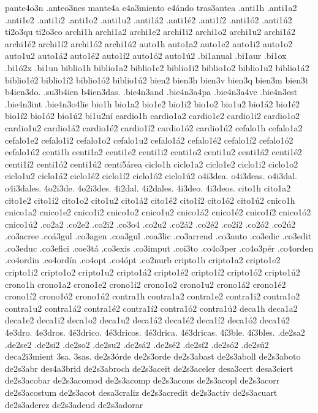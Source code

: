 {pante4o3n
.anteo3nes
mante4a
e4a3miento
e4ándo
tras3antea
.anti1h
.anti1a2 .anti1e2 .anti1i2 .anti1o2 .anti1u2
.anti1á2 .anti1é2 .anti1í2 .anti1ó2 .anti1ú2
ti2o3qu
ti2o3co
archi1h
archi1a2 archi1e2 archi1i2 archi1o2 archi1u2
archi1á2 archi1é2 archi1í2 archi1ó2 archi1ú2
auto1h
auto1a2 auto1e2 auto1i2 auto1o2 auto1u2
auto1á2 auto1é2 auto1í2 auto1ó2 auto1ú2
.bi1anual
.bi1aur
.bi1ox
.bi1ó2x
.bi1un
biblio1h
biblio1a2 biblio1e2 biblio1i2 biblio1o2 biblio1u2
biblio1á2 biblio1é2 biblio1í2 biblio1ó2 biblio1ú2
bien2
bien3h
bien3v
bien3q
bien3m
bien3t
b4ien3do.
.su3b4ien
b4ien3das.
.bie4n3and
.bie4n3a4pa
.bie4n3a4ve
.bie4n3est
.bie4n3int
.bie4n3o4lie
bio1h
bio1a2 bio1e2 bio1i2 bio1o2 bio1u2
bio1á2 bio1é2 bio1í2 bio1ó2 bio1ú2
bi1u2ní
cardio1h
cardio1a2 cardio1e2 cardio1i2 cardio1o2 cardio1u2
cardio1á2 cardio1é2 cardio1í2 cardio1ó2 cardio1ú2
cefalo1h
cefalo1a2 cefalo1e2 cefalo1i2 cefalo1o2 cefalo1u2
cefalo1á2 cefalo1é2 cefalo1í2 cefalo1ó2 cefalo1ú2
centi1h
centi1a2 centi1e2 centi1i2 centi1o2 centi1u2
centi1á2 centi1é2 centi1í2 centi1ó2 centi1ú2
centi5área
ciclo1h
ciclo1a2 ciclo1e2 ciclo1i2 ciclo1o2 ciclo1u2
ciclo1á2 ciclo1é2 ciclo1í2 ciclo1ó2 ciclo1ú2
o4i3dea.
o4i3deas.
o4i3dal.
o4i3dales.
4o2i3de.
4o2i3des.
4i2dal.
4i2dales.
4i3deo.
4i3deos.
cito1h
cito1a2 cito1e2 cito1i2 cito1o2 cito1u2
cito1á2 cito1é2 cito1í2 cito1ó2 cito1ú2
cnico1h
cnico1a2 cnico1e2 cnico1i2 cnico1o2 cnico1u2
cnico1á2 cnico1é2 cnico1í2 cnico1ó2 cnico1ú2
.co2a2
.co2e2
.co2i2
.co3o4
.co2u2
.co2á2
.co2é2
.co2í2
.co2ó2
.co2ú2
.co3acree
.coá3gul
.co3agen
.coa3gul
.coa3lic
.co3arrend
.co3auto
.co3edic
.co3edit
.co3educ
.co3efici
.coe3tá
.co3exis
.co3imput
.coi3to
.co4o3per
.co4o3pér
.co4orden
.co4ordin
.co4ordín
.co4opt
.co4ópt
.co2nurb
cripto1h
cripto1a2 cripto1e2 cripto1i2 cripto1o2 cripto1u2
cripto1á2 cripto1é2 cripto1í2 cripto1ó2 cripto1ú2
crono1h
crono1a2 crono1e2 crono1i2 crono1o2 crono1u2
crono1á2 crono1é2 crono1í2 crono1ó2 crono1ú2
contra1h
contra1a2 contra1e2 contra1i2 contra1o2 contra1u2
contra1á2 contra1é2 contra1í2 contra1ó2 contra1ú2
deca1h
deca1a2 deca1e2 deca1i2 deca1o2 deca1u2
deca1á2 deca1é2 deca1í2 deca1ó2 deca1ú2
4e3dro.
4e3dros.
4é3drico.
4é3dricos.
4é3drica.
4é3dricas.
4í3ble.
4í3bles.
.de2sa2 .de2se2 .de2si2 .de2so2 .de2su2
.de2sá2 .de2sé2 .de2sí2 .de2só2 .de2sú2
deca2i3mient
3sa.
3sas.
de2s3órde
de2s3orde
de2s3abast
de2s3aboll
de2s3aboto
de2s3abr
des4a3brid
de2s3abroch
de2s3aceit
de2s3aceler
desa3cert
desa3ciert
de2s3acobar
de2s3acomod
de2s3acomp
de2s3acons
de2s3acopl
de2s3acorr
de2s3acostum
de2s3acot
desa3craliz
de2s3acredit
de2s3activ
de2s3acuart
de2s3aderez
de2s3adeud
de2s3adorar
}
